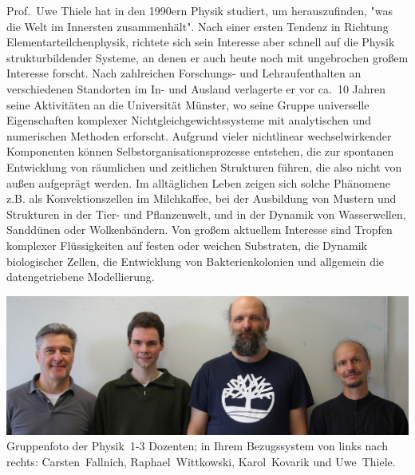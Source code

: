 \begin{multicols}{2}
Prof.\ Uwe Thiele hat in den 1990ern Physik studiert, um herauszufinden, "was die Welt im Innersten zusammenhält". Nach einer ersten Tendenz in Richtung Elementarteilchenphysik, richtete sich sein Interesse aber schnell auf die Physik strukturbildender Systeme, an denen er auch heute noch mit ungebrochen großem Interesse forscht. Nach zahlreichen Forschungs- und Lehraufenthalten an verschiedenen Standorten im In- und Ausland verlagerte er vor ca.\ 10 Jahren seine Aktivitäten an die Universität Münster, wo seine Gruppe universelle Eigenschaften komplexer Nichtgleichgewichtssysteme mit analytischen und numerischen Methoden erforscht. Aufgrund vieler nichtlinear wechselwirkender Komponenten können Selbstorganisationsprozesse entstehen, die zur spontanen Entwicklung von räumlichen und zeitlichen Strukturen führen, die also nicht von au{\ss}en aufgeprägt werden. Im alltäglichen Leben zeigen sich solche Phänomene z.B. als Konvektionszellen im Milchkaffee, bei der Ausbildung von Mustern und Strukturen in der Tier- und Pflanzenwelt, und in der Dynamik von Wasserwellen, Sanddünen oder Wolkenbändern. Von gro{\ss}em aktuellem Interesse sind Tropfen komplexer Flüssigkeiten auf festen oder weichen Substraten, die Dynamik biologischer Zellen, die Entwicklung von Bakterienkolonien und allgemein die datengetriebene Modellierung.

\end{multicols}

\begin{center}
\includegraphics[width=0.8\columnwidth]{res/vorstellungsfotos/profs_ws23.jpg}\\
\smallskip
Gruppenfoto der Physik~1-3 Dozenten; in Ihrem Bezugssystem von links nach rechts: Carsten~Fallnich, Raphael~Wittkowski, Karol~Kovarik und Uwe~Thiele.
\end{center}

\newpage

